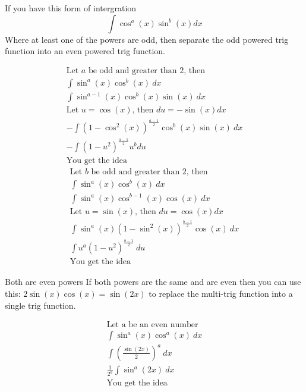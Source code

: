 \documentclass[letterpaper,10pt,twoside,twocolumn,openany]{book}
\begin{document}
\begin{DndComment}{If you have this form of intergration}
    \begin{equation}
        \int \cos^a(x) \sin^b(x) dx
    \end{equation}
    Where at least one of the powers are odd, then separate the odd powered trig function into an even powered trig function.
\end{DndComment}
\begin{gather*}
    \text{Let $a$ be odd and greater than 2, then}\\
    \int \sin^a(x) \cos^b(x)\ dx\\
    \int \sin^{a-1}(x) \cos^b(x) \sin(x)\ dx\\
    \text{Let $u = \cos(x)$, then $du = -\sin(x)dx$}\\
    -\int(1 - \cos^2(x))^{\frac{a-1}{2}} \cos^b(x) \sin(x)\ dx\\
    -\int (1 - u^2)^{\frac{a-1}{2}}  u^b du\\
    \text{You get the idea}
\end{gather*} 
\begin{gather*}
    \text{Let $b$ be odd and greater than 2, then}\\
    \int \sin^a(x) \cos^b(x)\ dx\\
    \int \sin^a(x) \cos^{b-1}(x) \cos(x)\ dx\\
    \text{Let $u = \sin(x)$, then $du = \cos(x)dx$}\\
    \int \sin^a(x)(1 - \sin^2(x))^{\frac{b-1}{2}} \cos(x)\ dx\\
    \int u^a (1 - u^2)^{\frac{b-1}{2}}\ du\\
    \text{You get the idea}
\end{gather*}
\begin{DndComment}{Both are even powers}
    If both powers are the same and are even then you can use this: $2 \sin(x) \cos(x) = \sin(2x)$ to replace the multi-trig function into a single trig function.
\end{DndComment}
\begin{gather*}
    \text{Let a be an even number}\\
    \int \sin^a(x) \cos^a(x)\ dx\\
    \int \left(\frac{\sin(2x)}{2}\right)^a\ dx\\
    \frac{1}{2^a} \int \sin^a(2x)\ dx\\
    \text{You get the idea}
\end{gather*}
\newpage
\end{document}
